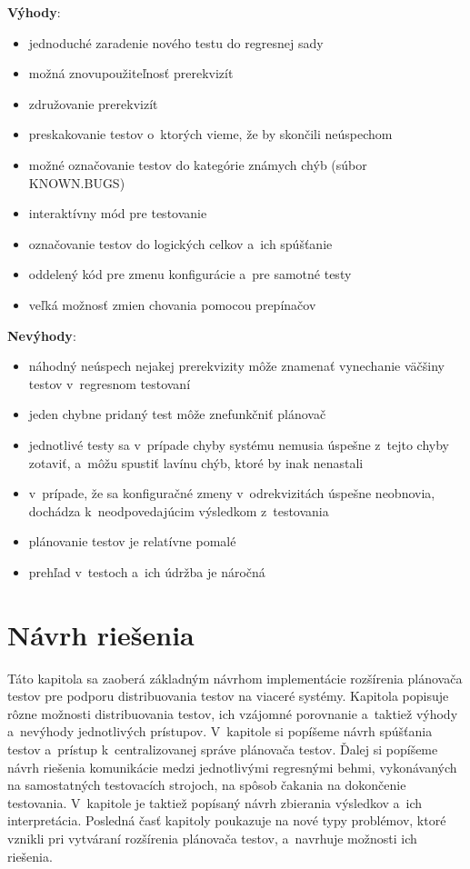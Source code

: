 \noindent \textbf{Výhody}:
\begin{itemize}
\item jednoduché zaradenie nového testu do regresnej sady
\item možná znovupoužiteľnosť prerekvizít
\item združovanie prerekvizít
\item preskakovanie testov o~ktorých vieme, že by skončili neúspechom
\item možné označovanie testov do kategórie známych chýb (súbor KNOWN.BUGS)
\item interaktívny mód pre testovanie
\item označovanie testov do logických celkov a~ich spúšťanie
\item oddelený kód pre zmenu konfigurácie a~pre samotné testy
\item veľká možnosť zmien chovania pomocou prepínačov
\end{itemize} 

\noindent \textbf{Nevýhody}:
\begin{itemize}
\item náhodný neúspech nejakej prerekvizity môže znamenať vynechanie 
väčšiny testov v~regresnom testovaní
\item jeden chybne pridaný test môže znefunkčniť plánovač
\item jednotlivé testy sa v~prípade chyby systému nemusia úspešne z~tejto 
chyby zotaviť, a~môžu spustiť lavínu chýb, ktoré by inak nenastali 
\item v~prípade, že sa konfiguračné zmeny v~odrekvizitách úspešne neobnovia, 
dochádza k~neodpovedajúcim výsledkom z~testovania
\item plánovanie testov je relatívne pomalé
\item prehľad v~testoch a~ich údržba je náročná
\end{itemize}



%
%
\chapter{Návrh riešenia}
\label{kapitola:navrh_riesenia}
Táto kapitola sa zaoberá základným návrhom implementácie rozšírenia 
plánovača testov pre podporu distribuovania testov na viaceré systémy. 
Kapitola popisuje rôzne možnosti distribuovania testov, ich vzájomné 
porovnanie a~taktiež výhody a~nevýhody jednotlivých prístupov. 
V~kapitole si popíšeme návrh spúšťania testov a~prístup k~centralizovanej 
správe plánovača testov. Ďalej si popíšeme návrh riešenia komunikácie 
medzi jednotlivými regresnými behmi, vykonávaných na samostatných 
testovacích strojoch, na spôsob čakania na dokončenie testovania. 
V~kapitole je taktiež popísaný návrh zbierania výsledkov a~ich interpretácia.
Posledná časť kapitoly poukazuje na nové typy problémov, ktoré vznikli pri
vytváraní rozšírenia plánovača testov, a~navrhuje možnosti ich riešenia.


